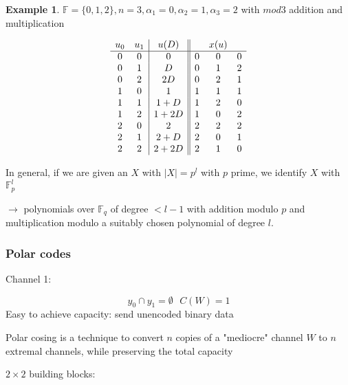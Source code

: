 \documentclass[twoside]{article}
\theoremstyle{definition} %
\newtheorem{example}{Example}
\def\F{\mathbb{F}}
\begin{document}
\begin{example}
  $\F = \{ 0, 1, 2 \}, n = 3, \alpha_1 = 0, \alpha_2 = 1, \alpha_3 = 2$ with $mod 3$ addition and multiplication

  \begin{align*}
    \begin{array}{c c | c || c c c }
      u_0 & u_1 & u(D) & & x(u) \\
      \hline
     0 & 0 & 0      & 0 & 0 & 0  \\
     0 & 1 & D      & 0 & 1 & 2  \\
     0 & 2 & 2D     & 0 & 2 & 1  \\
     1 & 0 & 1      & 1 & 1 & 1  \\
     1 & 1 & 1 + D  & 1 & 2 & 0  \\
     1 & 2 & 1 + 2D & 1 & 0 & 2  \\
     2 & 0 & 2      & 2 & 2 & 2  \\
     2 & 1 & 2 + D  & 2 & 0 & 1  \\
     2 & 2 & 2 + 2D & 2 & 1 & 0  \\
    \end{array}
  \end{align*}
\end{example}

In general, if we are given an $X$ with $|X| = p^l$ with $p$ prime, we identify $X$ with $\F_p^l$

$\rightarrow$ polynomials over $\F_q$ of degree $< l - 1$ with addition modulo $p$ and multiplication modulo a suitably chosen polynomial of degree $l$.


\subsubsection{Polar codes}

Channel 1:

\[
  y_0 \cap y_1 = \emptyset~~~C(W)=1
\]
Easy to achieve capacity: send unencoded binary data

Polar cosing is a technique to convert $n$ copies of a "mediocre" channel $W$ to $n$ extremal channels, while preserving the total capacity

$2\times 2$ building blocks:
\end{document}
